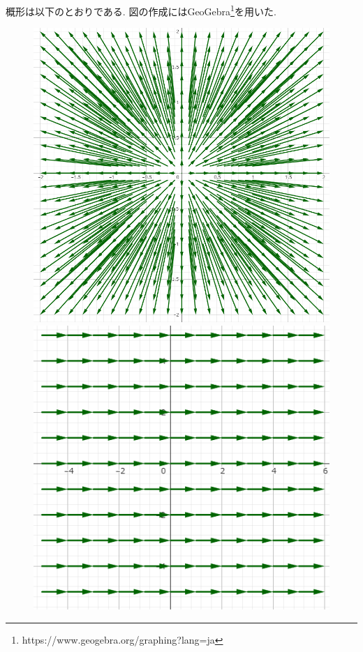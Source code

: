 \documentclass[a4j,dvipdfmx]{jsarticle}
\begin{document}
        \begin{qparts}
            \qpart 概形は以下のとおりである. 図の作成にはGeoGebra\footnote{https://www.geogebra.org/graphing?lang=ja}を用いた.
            \begin{figure}[h]
                \begin{minipage}[t]{.3\textwidth}
                    \centering
                    \includegraphics[scale=0.20]{img/vector_field1.png}
                \end{minipage}
                \begin{minipage}[t]{.3\textwidth}
                    \centering
                    \includegraphics[scale=0.35]{img/vector_field2.png}

\end{minipage}
\end{figure}
\end{qparts}
\end{document}
